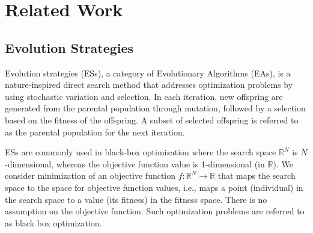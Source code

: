 \section{Related Work}
\subsection{Evolution Strategies}

Evolution strategies (ESs), a category of Evolutionary Algorithms (EAs), is a nature-inspired direct search method that addresses optimization problems by using stochastic variation and selection. In each iteration, new offspring are generated from the parental population through mutation, followed by a selection based on the fitness of the offspring. A subset of selected offspring is referred to as the parental population for the next iteration. 

ESs are commonly used in black-box optimization where the search space $\mathbb{R}^N$ is $N$-dimensional, whereas the objective function value is 1-dimensional (in $\mathbb{R}$). We consider minimization of an objective function $f:\mathbb{R}^N \rightarrow \mathbb{R}$ that maps the search space to the space for objective function values, i.e., maps a point (individual) in the search space to a value (its fitness) in the fitness space. There is no assumption on the objective function. Such optimization problems are referred to as black box optimization. 

